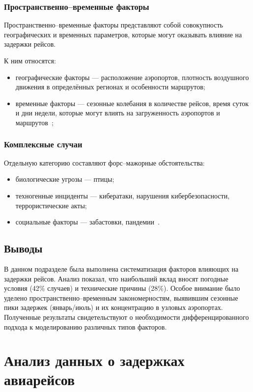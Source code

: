 \subsubsection*{Пространственно--временные факторы}
Пространственно--временные факторы представляют собой совокупность географических и временных параметров, которые могут оказывать влияние на задержки рейсов.

К ним относятся:
\begin{itemize}[label=---]
    \item географические факторы --- расположение аэропортов, плотность воздушного движения в определённых регионах и особенности маршрутов;
    \item временные факторы --- сезонные колебания в количестве рейсов, время суток и дни недели, которые могут влиять на загруженность аэропортов и маршрутов~\cite{spatial-delays-2022};
\end{itemize}

\subsubsection*{Комплексные случаи}
Отдельную категорию составляют форс--мажорные обстоятельства:
\begin{itemize}[label=---]
    \item биологические угрозы --- птицы;
    \item техногенные инциденты --- кибератаки, нарушения кибербезопасности, террористические акты;
    \item социальные факторы --- забастовки, пандемии~\cite{icao-covid}.
\end{itemize}

\subsection*{Выводы}

В данном подразделе была выполнена систематизация факторов влияющих на задержки рейсов.
Анализ показал, что наибольший вклад вносят погодные условия (42\% случаев) и технические причины (28\%).
Особое внимание было уделено пространственно--временным закономерностям, выявившим сезонные пики задержек (январь/июль) и их концентрацию в узловых аэропортах.
Полученные результаты свидетельствуют о необходимости дифференцированного подхода к моделированию различных типов факторов.

\section{Анализ данных о задержках авиарейсов}

